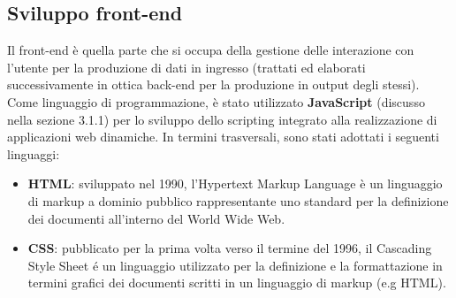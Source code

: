 \subsection{Sviluppo front-end}
Il front-end è quella parte che si occupa della gestione delle interazione con l'utente per la produzione di dati in ingresso (trattati ed elaborati successivamente in ottica back-end per la produzione in output degli stessi).\hfill \break
Come linguaggio di programmazione, è stato utilizzato \textbf{JavaScript} (discusso nella sezione 3.1.1) per lo sviluppo dello scripting integrato alla realizzazione di applicazioni web dinamiche. \hfill \break
In termini trasversali, sono stati adottati i seguenti linguaggi:
\begin{itemize}
    \item \textbf{HTML}: sviluppato nel 1990, l'Hypertext Markup Language è un linguaggio di markup a dominio pubblico
    rappresentante uno standard per la definizione dei documenti all'interno del World Wide Web.
    \item \textbf{CSS}: pubblicato per la prima volta verso il termine del 1996, il Cascading Style Sheet é un linguaggio utilizzato per la definizione e la formattazione in termini grafici dei documenti scritti in un linguaggio di markup (e.g HTML).
\end{itemize}

